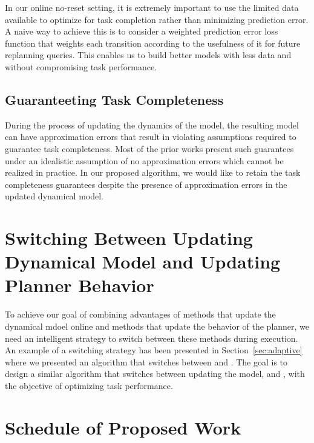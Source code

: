 In our online no-reset setting, it is extremely important to use the
limited data available to optimize for task completion rather than
minimizing prediction error. A naive way to achieve this is to
consider a weighted prediction error loss function that weights each
transition according to the usefulness of it for future replanning
queries. This enables us to build better models with less data and
without compromising task performance.

\subsection{Guaranteeting Task Completeness}
\label{sec:guar-task-compl}

During the process of updating the dynamics of the model, the
resulting model can have approximation errors that result in violating
assumptions required to guarantee task completeness. Most of the prior
works present such guarantees under an idealistic assumption of no
approximation errors which cannot be realized in practice. In our
proposed algorithm, we would like to retain the task completeness
guarantees despite the presence of approximation errors in the updated
dynamical model.

\section{Switching Between Updating Dynamical Model and Updating
  Planner Behavior}
\label{sec:switch-betw-cmax}

To achieve our goal of combining advantages of methods that update the
dynamical mdoel online and methods that update the behavior of the
planner, we need an intelligent strategy to switch between these
methods during execution. An example of a switching strategy has
been presented in Section~\ref{sec:adaptive} where we presented an
algorithm that switches between \cmax{} and \cmaxpp{}. The goal is to
design a similar algorithm that switches between updating the model,
\cmax{} and \cmaxpp{}, with the objective of optimizing task
performance.

\section{Schedule of Proposed Work}
\label{sec:sched-prop-work}

